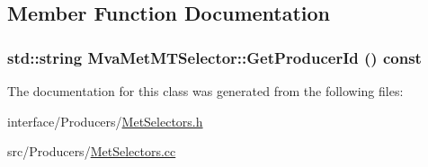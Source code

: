 \subsection{Member Function Documentation}
\hypertarget{classMvaMetMTSelector_a5fb79d33d8da06cb1b7c3a1ad9837d69}{
\subsubsection[{GetProducerId}]{\setlength{\rightskip}{0pt plus 5cm}std::string MvaMetMTSelector::GetProducerId () const}}
\label{classMvaMetMTSelector_a5fb79d33d8da06cb1b7c3a1ad9837d69}


The documentation for this class was generated from the following files:\begin{DoxyCompactItemize}
\item 
interface/Producers/\hyperlink{MetSelectors_8h}{MetSelectors.h}\item 
src/Producers/\hyperlink{MetSelectors_8cc}{MetSelectors.cc}\end{DoxyCompactItemize}
